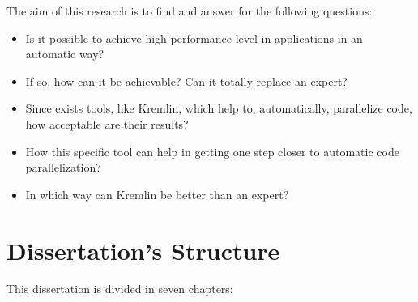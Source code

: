 The aim of this research is to find and answer for the following questions:

\begin{itemize}
	\item Is it possible to achieve high performance level in applications in an automatic way?
	\item If so, how can it be achievable? Can it totally replace an expert?
	\item Since exists tools, like Kremlin, which help to, automatically, parallelize code, how acceptable are their results?
	\item How this specific tool can help in getting one step closer to automatic code parallelization?
	\item In which way can Kremlin be better than an expert?
\end{itemize}


\section{Dissertation's Structure} \label{sec:struct}


This dissertation is divided in seven chapters:

